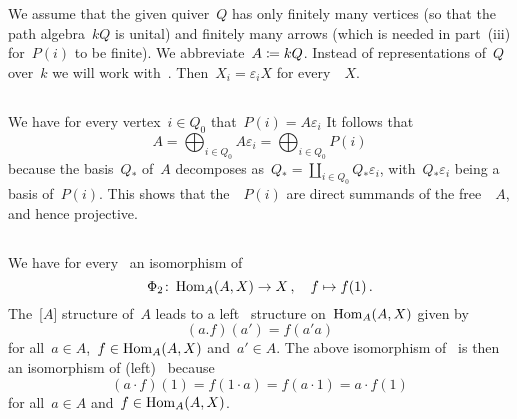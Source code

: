 \section{}

We assume that the given quiver~$Q$ has only finitely many vertices (so that the path algebra~$kQ$ is unital) and finitely many arrows (which is needed in part~(iii) for~$P(i)$ to be finite).
We abbreviate~$A \coloneqq kQ$.
Instead of representations of~$Q$ over~$k$ we will work with~{}.
Then~$X_i = \varepsilon_i X$ for every~{}~$X$.





\addtocounter{subsection}{1}





\subsection{}

We have for every vertex~$i \in Q_0$ that~$P(i) = A \varepsilon_i$
It follows that
\[
    A
  = \bigoplus_{i \in Q_0} A \varepsilon_i
  = \bigoplus_{i \in Q_0} P(i)
\]
because the basis~$Q_*$ of~$A$ decomposes as~$Q_* = \coprod_{i \in Q_0} Q_* \varepsilon_i$, with~$Q_* \varepsilon_i$ being a basis of~$P(i)$.
This shows that the~{}~$P(i)$ are direct summands of the free~{}~$A$, and hence projective.





\addtocounter{subsection}{-2}
\subsection{}

We have for every~{} an isomorphism of~{\kvss}
\[
  \Phi_2
  \colon
  \operatorname{Hom}_A(A, X)
  \to
  X \,,
  \quad
  f
  \mapsto
  f(1) \,.
\]
The~{[$A$]} structure of~$A$ leads to a left~{} structure on~$\operatorname{Hom}_A(A,X)$ given by
\[
    (a.f)(a')
  = f(a'a)
\]
for all~$a \in A$,~$f \in \operatorname{Hom}_A(A,X)$ and~$a' \in A$.
The above isomorphism of~{\kvs} is then an isomorphism of (left)~{} because
\[
    (a \cdot f)(1)
  = f(1 \cdot a)
  = f(a \cdot 1)
  = a \cdot f(1)
\]
for all~$a \in A$ and~$f \in \operatorname{Hom}_A(A,X)$.

